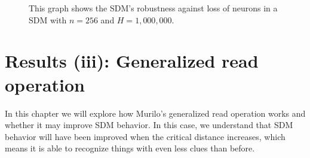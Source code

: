\begin{figure}[!p]
\centering
{}


\caption{This graph shows the SDM's robustness against loss of neurons in a SDM with $n=256$ and $H=1,000,000$.
\label{fig:sdm-neuron-death-256bits}}
\end{figure}


\chapter{Results (iii): Generalized read operation}


In this chapter we will explore how Murilo's generalized read operation works and whether it may improve SDM behavior. In this case, we understand that SDM behavior will have been improved when the critical distance increases, which means it is able to recognize things with even less clues than before.

